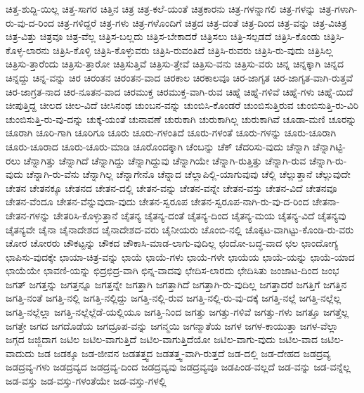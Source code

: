 {ಚಿತ್ತ-ಶುದ್ದಿ-ಯಿಲ್ಲ
ಚಿತ್ತ-ಸಾಗರ
ಚಿತ್ತಿನ
ಚಿತ್ರ
ಚಿತ್ರ-ಕಲೆ-ಯಂತೆ
ಚಿತ್ರಕಾರನು
ಚಿತ್ರ-ಗಳನ್ನಾಗಲಿ
ಚಿತ್ರ-ಗಳನ್ನು
ಚಿತ್ರ-ಗಳಾಗಿ-ರು-ವು-ದ-ರಿಂದ
ಚಿತ್ರ-ಗಳಿದ್ದರೆ
ಚಿತ್ರ-ಗಳು
ಚಿತ್ರ-ಗಳೊಂದಿಗೆ
ಚಿತ್ರದ
ಚಿತ್ರ-ದಂತೆ
ಚಿತ್ರ-ದಿಂದ
ಚಿತ್ರ-ವನ್ನು
ಚಿತ್ರ-ವಿಚಿತ್ರ
ಚಿತ್ರ-ವಿತ್ತು
ಚಿತ್ರವೂ
ಚಿತ್ರ-ವೆಲ್ಲ
ಚಿತ್ರಿಸ-ಬಲ್ಲದು
ಚಿತ್ರಿಸ-ಬೇಕಾದರೆ
ಚಿತ್ರಿಸಲು
ಚಿತ್ರಿ-ಸಲ್ಪಡದೆ
ಚಿತ್ರಿಸಿ-ಕೊಂಡು
ಚಿತ್ರಿಸಿ-ಕೊಳ್ಳ-ಲಾರನು
ಚಿತ್ರಿಸಿ-ಕೊಳ್ಳಿ
ಚಿತ್ರಿಸಿ-ಕೊಳ್ಳುವರು
ಚಿತ್ರಿಸಿ-ರುವಂತಿದೆ
ಚಿತ್ರಿಸಿ-ರುವರು
ಚಿತ್ರಿಸಿ-ರು-ವುದು
ಚಿತ್ರಿಸಿಲ್ಲ
ಚಿತ್ರಿಸು-ತ್ತಾರೆಂದು
ಚಿತ್ರಿಸು-ತ್ತಾರೋ
ಚಿತ್ರಿಸುತ್ತಿವೆ
ಚಿತ್ರಿಸು-ತ್ತೇವೆ
ಚಿತ್ರಿಸು-ವನು
ಚಿತ್ರಿಸು-ವರು
ಚಿನ್ನ
ಚಿನ್ನಕ್ಕಾಗಿ
ಚಿನ್ನದ
ಚಿನ್ನದ್ದು
ಚಿನ್ನ-ವನ್ನು
ಚಿರ
ಚಿರಂತನ
ಚಿರಂತನ-ವಾದ
ಚಿರಕಾಲ
ಚಿರಕಾಲವೂ
ಚಿರ-ಜಾಗೃತ
ಚಿರ-ಜಾಗೃತ-ವಾಗಿ-ರುತ್ತವೆ
ಚಿರ-ಜಾಗ್ರತ-ನಾದ
ಚಿರ-ನೂತನ-ವಾದ
ಚಿರಮುಕ್ತ
ಚಿರಮುಕ್ತ-ವಾಗಿ-ರುವ
ಚಿಹ್ನೆ
ಚಿಹ್ನೆ-ಗಳಿವೆ
ಚಿಹ್ನೆ-ಗಳು
ಚಿಹ್ನೆ-ಯಿದೆ
ಚೀಪುತ್ತಿದ್ದ
ಚೀಲದ
ಚೀಲ-ವಿದೆ
ಚೀಸಿನಂಥ
ಚುಂಬನ-ವನ್ನು
ಚುಂಬಿಸಿ-ಕೊಂಡರೆ
ಚುಂಬಿಸುತ್ತಿರುವ
ಚುಂಬಿಸುತ್ತಿ-ರು-ವಿರಿ
ಚುಂಬಿಸುತ್ತಿ-ರು-ವು-ದನ್ನು
ಚುಕ್ಕೆ-ಯಂತೆ
ಚುನಾವಣೆ
ಚುರುಕಾಗಿ
ಚುರುಕಾಗಿಲ್ಲ
ಚುರುಕಾಗಿವೆ
ಚೂಡಾ-ಮಣಿ
ಚೂರನ್ನು
ಚೂರಾಗಿ
ಚೂರಿ-ಗಾಗಿ
ಚೂರಿಗೂ
ಚೂರು
ಚೂರು-ಗಳಂತಿದೆ
ಚೂರು-ಗಳಂತೆ
ಚೂರು-ಗಳನ್ನು
ಚೂರು-ಚೂರಾಗಿ
ಚೂರು-ಚೂರಾದ
ಚೂರು-ಚೂರು-ಮಾಡಿ
ಚೂರೊಂದಕ್ಕಾಗಿ
ಚೆಂಬನ್ನು
ಚೆಕ್
ಚೆದರಿಸು-ವುದು
ಚೆನ್ನಾಗಿ
ಚೆನ್ನಾಗಿಟ್ಟಿ-ರಲು
ಚೆನ್ನಾಗಿತ್ತು
ಚೆನ್ನಾಗಿದೆ
ಚೆನ್ನಾಗಿದ್ದು
ಚೆನ್ನಾಗಿದ್ದುವು
ಚೆನ್ನಾಗಿಯೇ
ಚೆನ್ನಾಗಿ-ರುತ್ತಿತ್ತು
ಚೆನ್ನಾಗಿ-ರುವ
ಚೆನ್ನಾಗಿ-ರು-ವುದು
ಚೆನ್ನಾಗಿ-ರು-ವೆನು
ಚೆನ್ನಾಗಿಲ್ಲ
ಚೆನ್ನಾಗೇನೊ
ಚೆನ್ನಾದ
ಚೆಲ್ಲಾಪಿಲ್ಲಿ-ಯಾಗುವುವು
ಚೆಲ್ಲಿ
ಚೆಲ್ಲುತ್ತಾನೆ
ಚೆಲ್ಲುವುದೇ
ಚೇತನ
ಚೇತನಕ್ಕೂ
ಚೇತನದ
ಚೇತನ-ದಲ್ಲಿ
ಚೇತನ-ವನ್ನು
ಚೇತನ-ವನ್ನೇ
ಚೇತನ-ವಸ್ತು
ಚೇತನ-ವಿದೆ
ಚೇತನವೂ
ಚೇತನ-ವೆಂದೂ
ಚೇತನ-ವೆನ್ನುವುದಾ-ವುದು
ಚೇತನ-ಸ್ವರೂಪ
ಚೇತನ-ಸ್ವರೂಪ-ನಾಗಿ-ರು-ವು-ದ-ರಿಂದ
ಚೇತನಾ-ಚೇತನ-ಗಳನ್ನು
ಚೇತರಿಸಿ-ಕೊಳ್ಳುತ್ತಾನೆ
ಚೈತನ್ಯ
ಚೈತನ್ಯ-ದಂತೆ
ಚೈತನ್ಯ-ದಿಂದ
ಚೈತನ್ಯ-ಮಯ
ಚೈತನ್ಯ-ವಿದೆ
ಚೈತನ್ಯವು
ಚೈತನ್ಯವೇ
ಚೈನಾ
ಚೈನಾದೇಶದ
ಚೈನಾದೇಶದ-ವರು
ಚೈನೀಯರು
ಚೊಂಬಿ-ನಲ್ಲಿ
ಚೊಕ್ಕಟ-ವಾಗಿಟ್ಟು-ಕೊಂಡಿ-ರು-ವರು
ಚೋರ
ಚೋರರು
ಚೌಕಟ್ಟನ್ನು
ಚೌಕದ
ಚೌಕಾಸಿ-ಮಾಡ-ಲಾಗು-ವುದಿಲ್ಲ
ಛಂದೋ-ಬದ್ಧ-ವಾದ
ಛಲ
ಛಾಂದೋಗ್ಯ
ಛಾಪಿಸು-ವುದಕ್ಕೇ
ಛಾಯಾ-ಚಿತ್ರ-ವನ್ನು
ಛಾಯೆ
ಛಾಯೆ-ಗಳು
ಛಾಯೆ-ಗಳೇ
ಛಾಯೆಯ
ಛಾಯೆ-ಯನ್ನು
ಛಾಯೆ-ಯಾದ
ಛಾಯೆಯೇ
ಛಾವಣಿ-ಯನ್ನು
ಛಿದ್ರಛಿದ್ರ-ವಾಗಿ
ಛಿನ್ನ-ವಾದವು
ಛೇದಿಸ-ಲಾರದು
ಛೇದಿಸಿತು
ಜಂಜಾಟ-ದಿಂದ
ಜಂಭ
ಜಗತ್
ಜಗತ್ತನ್ನು
ಜಗತ್ತನ್ನೂ
ಜಗತ್ತನ್ನೇ
ಜಗತ್ತಾಗಿ
ಜಗತ್ತಾಗಿದೆ
ಜಗತ್ತಾಗಿ-ರು-ವುದಿಲ್ಲ
ಜಗತ್ತಾದರೆ
ಜಗತ್ತಿಗೆ
ಜಗತ್ತಿನ
ಜಗತ್ತಿ-ನಂತೆ
ಜಗತ್ತಿ-ನಲ್ಲಿ
ಜಗತ್ತಿ-ನಲ್ಲಿದ್ದು
ಜಗತ್ತಿ-ನಲ್ಲಿ-ರುವ
ಜಗತ್ತಿ-ನಲ್ಲಿ-ರು-ವು-ದಕ್ಕೆ
ಜಗತ್ತಿ-ನಲ್ಲೆ
ಜಗತ್ತಿ-ನಲ್ಲೆಲ್ಲ
ಜಗತ್ತಿ-ನಲ್ಲೆಲ್ಲಾ
ಜಗತ್ತಿ-ನಲ್ಲೆಲ್ಲೆಡೆ-ಯಲ್ಲಿಯೂ
ಜಗತ್ತಿ-ನಿಂದ
ಜಗತ್ತು
ಜಗತ್ತು-ಗಳಿವೆ
ಜಗತ್ತು-ಗಳು
ಜಗತ್ತೂ
ಜಗತ್ತೆಲ್ಲ
ಜಗತ್ತೇ
ಜಗದ
ಜಗದೊಡೆಯ
ಜಗದ್ರೂಪ-ವನ್ನು
ಜಗನ್ಮಯಿ
ಜಗನ್ಮಾತೆಯ
ಜಗಳ
ಜಗಳ-ಕಾಯುತ್ತಾ
ಜಗಳ-ವೆಲ್ಲಾ
ಜಗ್ಗದ
ಜಜ್ಜಿದಾಗ
ಜಟಿಲ
ಜಟಿಲ-ವಾಗುತ್ತಿದೆ
ಜಟಿಲ-ವಾಗುತ್ತಿದೆಯೋ
ಜಟಿಲ-ವಾಗು-ವುದು
ಜಟಿಲ-ವಾದ
ಜಟಿಲ-ವಾದುದು
ಜಡ
ಜಡಕ್ಕೂ
ಜಡ-ಜೀವನ
ಜಡತತ್ತ್ವದ
ಜಡತತ್ತ್ವ-ವಾಗಿ-ರುತ್ತದೆ
ಜಡ-ದಲ್ಲಿ
ಜಡ-ದೇಹದ
ಜಡದ್ರವ್ಯ
ಜಡದ್ರವ್ಯ-ಗಳು
ಜಡದ್ರವ್ಯದ
ಜಡದ್ರವ್ಯ-ದಿಂದ
ಜಡದ್ರವ್ಯವು
ಜಡದ್ರವ್ಯವೂ
ಜಡಪಿಂಡ-ವಲ್ಲದೆ
ಜಡ-ವನ್ನು
ಜಡ-ವನ್ನೆಲ್ಲ
ಜಡ-ವಸ್ತು
ಜಡ-ವಸ್ತು-ಗಳಂತೆಯೇ
ಜಡ-ವಸ್ತು-ಗಳಲ್ಲಿ
}
